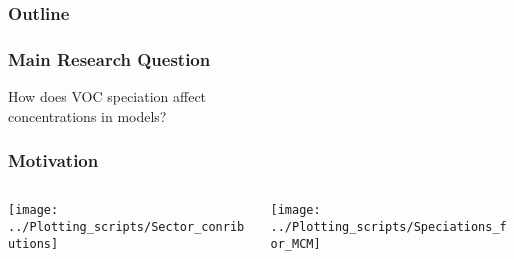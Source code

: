 \begin{frame}
    \frametitle{Outline} 
    \tableofcontents[currentsection]
\end{frame} 

\begin{frame}
    \frametitle{Main Research Question} 

    \vspace{-0.7cm}
    \begin{center}
        \LARGE{How does VOC speciation affect\\\vspace{3mm}  concentrations in models?}
    \end{center}
\end{frame}

\begin{frame}
    \frametitle{Motivation}
    \begin{columns}[onlytextwidth]
        \begin{column}{0.45\textwidth}
            \begin{flushleft}
                \vspace{-1.5cm}
                \texttt{[image: ../Plotting\_scripts/Sector\_conributions]} 
            \end{flushleft}
        \end{column}%
        \begin{column}{0.45\textwidth}
            \begin{flushright}
                \vspace{-1.5cm}
                \texttt{[image: ../Plotting\_scripts/Speciations\_for\_MCM]} 
            \end{flushright}
        \end{column}
    \end{columns}
\end{frame}

